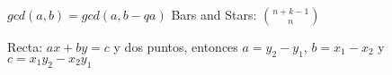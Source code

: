 {\normalsize
    $ gcd(a,b) = gcd(a, b-qa)$
    \hspace{4em} Bars and Stars: $ \binom{n+k-1}{n} $
    
    Recta: $ax + by = c$ y dos puntos, entonces $a = y_2-y_1$, $b = x_1-x_2$ y $c = x_1y_2-x_2y_1$
}


